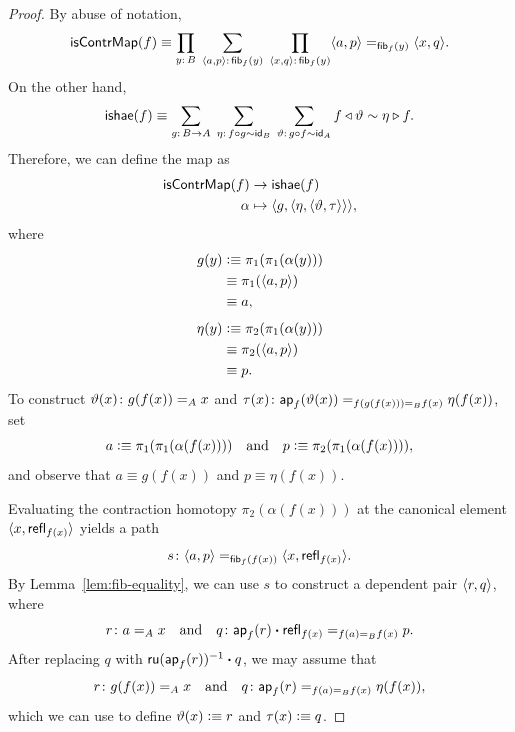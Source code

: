 \begin{proof}
    By abuse of notation,
    \[
        \fun{isContrMap}(f)\equiv
            \prod_{y\colon B}\;
            \sum_{\dep{a,p}\colon\fun{fib}_f(y)}\;
            \prod_{\dep{x,q}\colon\fun{fib}_f(y)}
            \dep{a,p}\eq{\fun{fib}_f(y)}\dep{x,q}.
    \]
    On the other hand,
    \[
        \fun{ishae}(f)\equiv
            \sum_{g\colon B\to A}\;
            \sum_{\eta\colon f\circ g\sim\id_B}\;
            \sum_{\vartheta\colon g\circ f\sim\id_A}
            f\lwct\vartheta\sim\eta\rwct f.
    \]
    Therefore, we can define the map as
    \begin{align*}
        \mathsf{isContrMap}(f)&\to\mathsf{ishae}(f)\\
        \alpha&\mapsto\langle g,\langle\eta,\langle\vartheta,\tau\rangle\rangle\rangle,
    \end{align*}
    where
    \begin{align*}
        g(y)
            &\mathrel{\vcentcolon}\equiv\pi_1(\pi_1(\alpha(y)))\\
            &\equiv\pi_1(\langle a,p\rangle)\\
            &\equiv a,\\[1ex]
        \eta(y)
            &\mathrel{\vcentcolon}\equiv\pi_2(\pi_1(\alpha(y)))\\
            &\equiv\pi_2(\langle a,p\rangle)\\
            &\equiv p.
    \end{align*}
    To construct $\vartheta(x)\colon g(f(x))\eq A x$ and $\tau(x)\colon\fun{ap}_f(\vartheta(x))\eq{f(g(f(x)))\eq B f(x)}\eta(f(x))$, set 
    \[
        a\mathrel{\vcentcolon}\equiv\pi_1(\pi_1(\alpha(f(x))))
        \quad\text{and}\quad
        p\mathrel{\vcentcolon}\equiv\pi_2(\pi_1(\alpha(f(x)))),
    \]
    and observe that $a\equiv g(f(x))$ and $p\equiv\eta(f(x))$.
    
    Evaluating the contraction homotopy $\pi_2(\alpha(f(x)))$ at the canonical element $\langle x,\mathsf{refl}_{f(x)}\rangle$ yields a path 
    \[
        s\colon
            \dep{a,p}
            \eq{\fun{fib}_f(f(x))}
            \dep{x,\fun{refl}_{f(x)}}.
    \]
    By Lemma~\ref{lem:fib-equality}, we can use $s$ to construct a dependent pair $\langle r,q\rangle$, where
    \[
        r\colon a\eq A x
        \quad\text{and}\quad
        q\colon
            \fun{ap}_f(r)\ct\fun{refl}_{f(x)}
            \eq{f(a)\eq B f(x)}
            p.
    \]
    After replacing $q$ with $\mathsf{ru}(\mathsf{ap}_f(r))^{-1}\mathbin{\boldsymbol{\cdot}} q$, we may assume that
    \[
        r\colon g(f(x))\eq A x
        \quad\text{and}\quad
        q\colon\fun{ap}_f(r)\eq{f(a)\eq B f(x)}\eta(f(x)),
    \]
    which we can use to define $\vartheta(x)\mathrel{\vcentcolon}\equiv r$ and $\tau(x)\mathrel{\vcentcolon}\equiv q$.
    
\end{proof}

